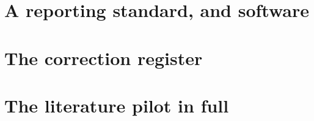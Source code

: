 \documentclass[preprint,12pt,authoryear]{elsarticle}
\theoremstyle{definition}
\begin{document}
\section{A reporting standard, and software}
\label{app:standard}


\section{The correction register}
\label{app:corrections}


\section{The literature pilot in full}
\label{app:pilot}




\end{document}
